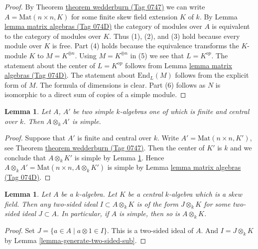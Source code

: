 \documentclass{amsart}
\theoremstyle{plain}
\newtheorem{lemma}[subsection]{Lemma}
\theoremstyle{definition}
\theoremstyle{remark}
\numberwithin{equation}{subsection}
\begin{document}
\begin{proof}
By
Theorem \href{https://stacks.math.columbia.edu/tag/0747}{theorem wedderburn (Tag 0747)}
we can write $A = \text{Mat}(n \times n, K)$ for some finite skew
field extension $K$ of $k$. By
Lemma \href{https://stacks.math.columbia.edu/tag/074D}{lemma matrix algebras (Tag 074D)}
the category of modules over $A$ is equivalent to the category of
modules over $K$. Thus (1), (2), and (3) hold
because every module over $K$ is free. Part (4) holds
because the equivalence transforms the $K$-module $K$
to $M = K^{\oplus n}$. Using $M = K^{\oplus n}$ in (5)
we see that $L = K^{op}$. The statement about the center of $L = K^{op}$
follows from
Lemma \href{https://stacks.math.columbia.edu/tag/074D}{lemma matrix algebras (Tag 074D)}.
The statement about $\text{End}_L(M)$ follows from the explicit form
of $M$. The formula of dimensions is clear.
Part (6) follows as $N$ is isomorphic to a direct sum of
copies of a simple module.
\end{proof}

\begin{lemma}
\label{lemma-tensor-simple}
Let $A$, $A'$ be two simple $k$-algebras one of which is finite and central
over $k$. Then $A \otimes_k A'$ is simple.
\end{lemma}

\begin{proof}
Suppose that $A'$ is finite and central over $k$.
Write $A' = \text{Mat}(n \times n, K')$, see
Theorem \href{https://stacks.math.columbia.edu/tag/0747}{theorem wedderburn (Tag 0747)}.
Then the center of $K'$ is $k$ and we conclude that
$A \otimes_k K'$ is simple by
Lemma \ref{lemma-generate-two-sided-ideal}.
Hence $A \otimes_k A' = \text{Mat}(n \times n, A \otimes_k K')$ is simple
by Lemma \href{https://stacks.math.columbia.edu/tag/074D}{lemma matrix algebras (Tag 074D)}.
\end{proof}

\begin{lemma}
\label{lemma-generate-two-sided-ideal}
Let $A$ be a $k$-algebra. Let $K$ be a central $k$-algebra
which is a skew field. Then any two-sided ideal $I \subset A \otimes_k K$
is of the form $J \otimes_k K$ for some two-sided ideal $J \subset A$.
In particular, if $A$ is simple, then so is $A \otimes_k K$.
\end{lemma}

\begin{proof}
Set $J = \{a \in A \mid a \otimes 1 \in I\}$. This is a two-sided ideal
of $A$. And $I = J \otimes_k K$ by
Lemma \ref{lemma-generate-two-sided-sub}.
\end{proof}
\end{document}
